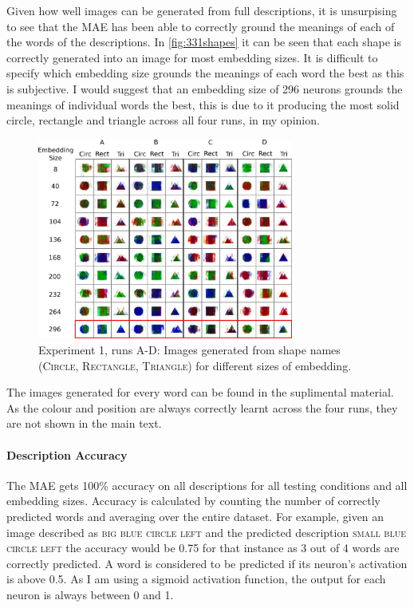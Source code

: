 
Given how well images can be generated from full descriptions, it is unsurpising to see that the \ac{MAE} has been able to correctly ground the meanings of each of the words of the descriptions. In \autoref{fig:331shapes} it can be seen that each shape is correctly generated into an image for most embedding sizes. It is difficult to specify which embedding size grounds the meanings of each word the best as this is subjective. I would suggest that an embedding size of 296 neurons grounds the meanings of individual words the best, this is due to it producing the most solid circle, rectangle and triangle across all four runs, in my opinion. 

\begin{figure}[h]
\centering
\includegraphics[width=0.75\textwidth]{Figs/shapes/shapes331.png}
\caption{Experiment 1, runs A-D:  Images generated from shape names (\textsc{Circle, Rectangle, Triangle}) for different sizes of embedding.}
\label{fig:331shapes}
\end{figure}

The images generated for every word can be found in the suplimental material. As the colour and position are always  correctly learnt across the four runs, they are not shown in the main text.



\paragraph{Description Accuracy}
The \ac{MAE} gets 100\% accuracy on all descriptions for all testing conditions and all embedding sizes. Accuracy is calculated by counting the number of correctly predicted words and averaging over the entire dataset. For example, given an image described as \textsc{big blue circle left} and the predicted description \textsc{small blue circle left} the accuracy would be 0.75 for that instance as 3 out of 4 words are correctly predicted. A word is considered to be predicted if its neuron's activation is above 0.5. As I am using a sigmoid activation function, the output for each neuron is always between 0 and 1.


